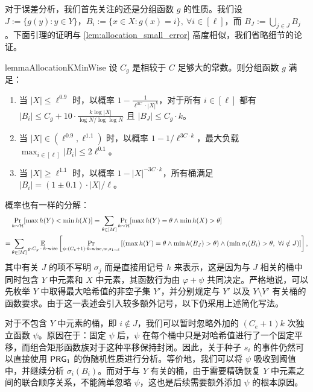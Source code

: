对于误差分析，我们首先关注的还是分组函数 $g$ 的性质。我们设 $J := \{g(y) : y \in Y\}$，$B_i := \{x \in X : g(x) = i\},\ \forall i \in [\ell]$，而 $B_J := \bigcup_{j \in J} B_j$。下面引理的证明与 \cref{lem:allocation_small_error} 高度相似，我们省略细节的论证。

\begin{restatable}{lemma}{AllocationKMinWise}\label{lem:allocation_k_min_wise}
    设 $C_g$ 是相较于 $C$ 足够大的常数。则分组函数 $g$ 满足：
    \begin{enumerate}
        \item 当 $|X| \le \ell^{0.9}$ 时，以概率 $1 - \frac{1}{\ell^{3 C} \cdot |X|^{k}}$，对于所有 $i \in [\ell]$ 都有 $|B_i| \le C_g + 10 \cdot \frac{k \log |X|}{\log N / \log \log N}$ 且 $|B_J| \le C_g \cdot k$。
        
        \item 当 $|X| \in (\ell^{0.9}, \ell^{1.1})$ 时，以概率 $1 - 1 / \ell^{3 C \cdot k}$，最大负载 $\max_{i \in [\ell]} |B_i| \le 2 \ell^{0.1}$。
        
        \item 当 $|X| \ge \ell^{1.1}$ 时，以概率 $1-|X|^{-3 C \cdot k}$，所有桶满足 $|B_i| = (1 \pm 0.1) \cdot |X| / \ell$。
    \end{enumerate}
\end{restatable}

概率也有一样的分解：
\begin{align*}
      & \Pr_{h \sim \mathcal{H}}[\max h(Y) < \min h(X)] = \sum_{\theta \in [M]} \Pr_{h \sim \mathcal{H}}[\max h(Y) = \theta \wedge \min h(X) > \theta] \\
    = & \sum_{\theta \in [M]} \operatorname*{\mathbb{E}}_{g : \text{$C_g \cdot k$-wise}} \left[\Pr_{\psi : (C_e + 1) \cdot k\text{-wise}, w, s_{1 \sim \ell}} \left[ (\max h(Y) = \theta \wedge \min h(B_J) > \theta) \wedge (\min \sigma_i(B_i) > \theta,\ \forall i \notin J)  \right]  \right],
\end{align*}
其中有关 $J$ 的项不写明 $\sigma_j$ 而是直接用记号 $h$ 来表示，这是因为与 $J$ 相关的桶中同时包含 $Y$ 中元素和 $X$ 中元素，其函数行为由 $\varphi+\psi$ 共同决定。严格地说，可以先枚举 $Y$ 中取得最大哈希值的非空子集 $Y'$，并分别规定与 $Y'$ 以及 $Y \setminus Y'$ 有关桶的函数要求。由于这一表述会引入较多额外记号，以下仍采用上述简化写法。

对于不包含 $Y$ 中元素的桶，即 $i\notin J$，我们可以暂时忽略外加的 $(C_e+1)k$ 次独立函数 $\psi$。原因在于：固定 $\psi$ 后，$\psi$ 在每个桶中只是对哈希值进行了一个固定平移，而组合矩形函数族对于这种平移保持封闭。因此，关于种子 $s_i$ 的事件仍然可以直接使用 $\mathsf{PRG}_1$ 的伪随机性质进行分析。等价地，我们可以将 $\psi$ 吸收到阈值中，并继续分析 $\sigma_i(B_i)$。而对于与 $Y$ 有关的桶，由于需要精确恢复 $Y$ 中元素之间的联合顺序关系，不能简单忽略 $\psi$，这也是后续需要额外添加 $\psi$ 的根本原因。

